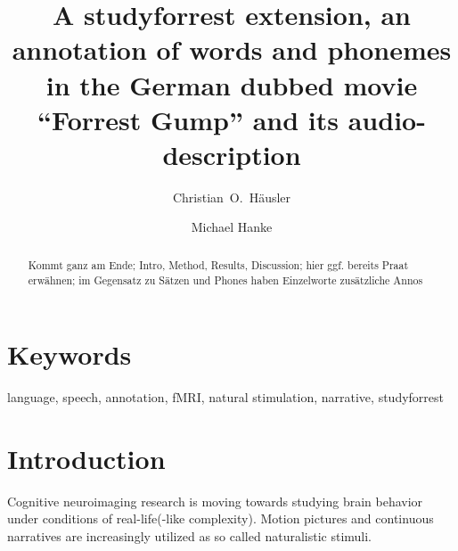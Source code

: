 \documentclass[10pt,a4paper,onecolumn]{article}
\begin{document}



\title{A studyforrest extension, an annotation of words and phonemes in the German dubbed movie ``Forrest Gump'' and its audio-description}

\author[1, 2]{Christian~O.~Häusler}
\author[1, 2]{Michael Hanke}


\maketitle
\thispagestyle{fancy}
\begin{abstract}
Kommt ganz am Ende;
Intro, Method, Results, Discussion;
hier ggf. bereits Praat erwähnen;
im Gegensatz zu Sätzen und Phones haben Einzelworte zusätzliche Annos


\end{abstract}
\section*{Keywords}
language, speech, annotation, fMRI, natural stimulation, narrative, studyforrest

\listoftodos

\clearpage


\section*{Introduction}

Cognitive neuroimaging research is moving towards studying brain behavior
under conditions of real-life(-like complexity). Motion pictures \citep{hasson2008neurocinematics} and continuous narratives \citep{honey2012not, lerner2011topographic} are increasingly utilized as so called naturalistic stimuli.
\end{document}
